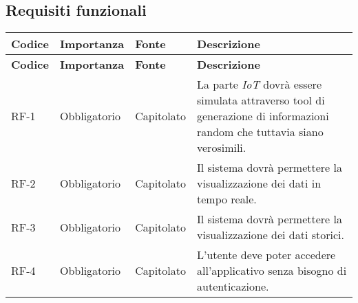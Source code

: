 \subsection{Requisiti funzionali}
\begin{longtable}{|>{\centering\arraybackslash}m{}|>{\centering\arraybackslash}m{}|>{\centering\arraybackslash}m{}|>{\centering\arraybackslash}m{}|}
	\hline
	\textbf{Codice} & \textbf{Importanza} & \textbf{Fonte} & \textbf{Descrizione}                                                                                                                                                                                                                                                                                               \\\hline
	\hline
	\endfirsthead
	\hline
	\textbf{Codice} & \textbf{Importanza} & \textbf{Fonte} & \textbf{Descrizione}                                                                                                                                                                                                                                                                                               \\\hline
	\endhead
	\hline
	RF-1            & Obbligatorio        & Capitolato     & La parte \textit{IoT} dovrà essere simulata attraverso tool di generazione di informazioni random che tuttavia siano verosimili.                                                                                                                                                                                   \\\hline
	RF-2            & Obbligatorio        & Capitolato     & Il sistema dovrà permettere la visualizzazione dei dati in tempo reale.                                                                                                                                                                                                                                            \\\hline
	RF-3            & Obbligatorio        & Capitolato     & Il sistema dovrà permettere la visualizzazione dei dati storici.                                                                                                                                                                                                                                                   \\\hline
	RF-4            & Obbligatorio        & Capitolato     & L'utente deve poter accedere all'applicativo senza bisogno di autenticazione.                                                                                                                                                                                                                                      \\\hline

\end{longtable}
